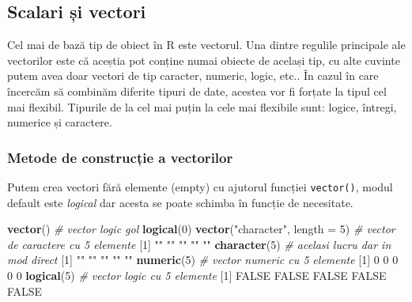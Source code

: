 \documentclass[]{article}
\newenvironment{Shaded}{\begin{snugshade}}{\end{snugshade}}
\newcommand{\CommentTok}[1]{\textcolor[rgb]{0.56,0.35,0.01}{\textit{#1}}}
\newcommand{\DataTypeTok}[1]{\textcolor[rgb]{0.13,0.29,0.53}{#1}}
\newcommand{\DecValTok}[1]{\textcolor[rgb]{0.00,0.00,0.81}{#1}}
\newcommand{\KeywordTok}[1]{\textcolor[rgb]{0.13,0.29,0.53}{\textbf{#1}}}
\newcommand{\NormalTok}[1]{#1}
\newcommand{\OtherTok}[1]{\textcolor[rgb]{0.56,0.35,0.01}{#1}}
\newcommand{\StringTok}[1]{\textcolor[rgb]{0.31,0.60,0.02}{#1}}
\begin{document}
\hypertarget{scalari-ux219i-vectori}{%
\subsection{Scalari și vectori}\label{scalari-ux219i-vectori}}

Cel mai de bază tip de obiect în R este vectorul. Una dintre regulile
principale ale vectorilor este că aceștia pot conține numai obiecte de
același tip, cu alte cuvinte putem avea doar vectori de tip caracter,
numeric, logic, etc.. În cazul în care încercăm să combinăm diferite
tipuri de date, acestea vor fi forțate la tipul cel mai flexibil.
Tipurile de la cel mai puțin la cele mai flexibile sunt: logice,
întregi, numerice și caractere.

\hypertarget{metode-de-construcux21bie-a-vectorilor}{%
\subsubsection{Metode de construcție a
vectorilor}\label{metode-de-construcux21bie-a-vectorilor}}

Putem crea vectori fără elemente (empty) cu ajutorul funcției
\texttt{vector()}, modul default este \emph{logical} dar acesta se poate
schimba în funcție de necesitate.

\begin{Shaded}
\begin{Highlighting}[]
\KeywordTok{vector}\NormalTok{() }\CommentTok{# vector logic gol}
\KeywordTok{logical}\NormalTok{(}\DecValTok{0}\NormalTok{)}
\KeywordTok{vector}\NormalTok{(}\StringTok{"character"}\NormalTok{, }\DataTypeTok{length =} \DecValTok{5}\NormalTok{) }\CommentTok{# vector de caractere cu 5 elemente}
\NormalTok{[}\DecValTok{1}\NormalTok{] }\StringTok{""} \StringTok{""} \StringTok{""} \StringTok{""} \StringTok{""}
\KeywordTok{character}\NormalTok{(}\DecValTok{5}\NormalTok{) }\CommentTok{# acelasi lucru dar in mod direct}
\NormalTok{[}\DecValTok{1}\NormalTok{] }\StringTok{""} \StringTok{""} \StringTok{""} \StringTok{""} \StringTok{""}
\KeywordTok{numeric}\NormalTok{(}\DecValTok{5}\NormalTok{)   }\CommentTok{# vector numeric cu 5 elemente}
\NormalTok{[}\DecValTok{1}\NormalTok{] }\DecValTok{0} \DecValTok{0} \DecValTok{0} \DecValTok{0} \DecValTok{0}
\KeywordTok{logical}\NormalTok{(}\DecValTok{5}\NormalTok{)   }\CommentTok{# vector logic cu 5 elemente}
\NormalTok{[}\DecValTok{1}\NormalTok{] }\OtherTok{FALSE} \OtherTok{FALSE} \OtherTok{FALSE} \OtherTok{FALSE} \OtherTok{FALSE}
\end{Highlighting}
\end{Shaded}
\end{document}
